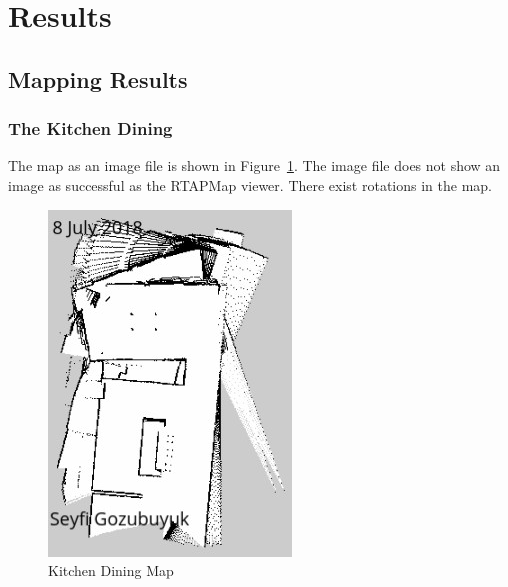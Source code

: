 \documentclass[10pt,journal,compsoc]{IEEEtran}
\begin{document}
\section{Results}

\subsection{Mapping Results}
\subsubsection{The Kitchen Dining}
The map as an image file is shown in Figure~\ref{fig:mapkit}. The image file does not show an image as successful as the RTAPMap viewer. There exist rotations in the map.

\begin{figure}[thpb]
      \centering
      \includegraphics[width=\linewidth]{figures/map_kitchen.png}
      \caption{Kitchen Dining Map}
      \label{fig:mapkit}
\end{figure}
\end{document}
